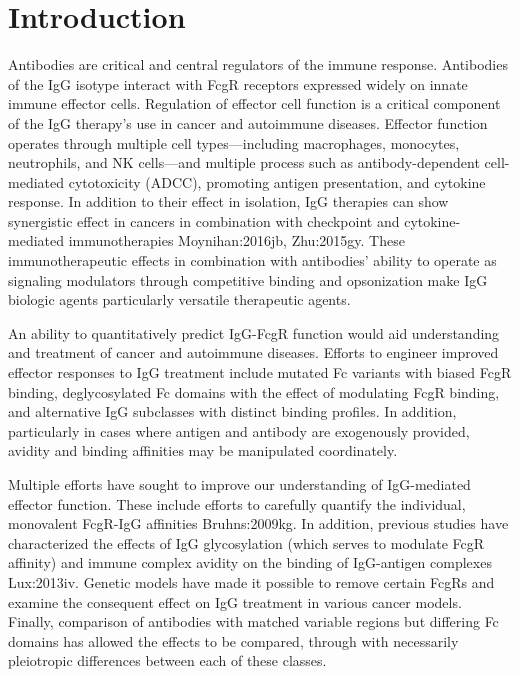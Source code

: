 \section{Introduction}

Antibodies are critical and central regulators of the immune response. Antibodies of the IgG isotype interact with FcgR receptors expressed widely on innate immune effector cells. Regulation of effector cell function is a critical component of the IgG therapy's use in cancer and autoimmune diseases. Effector function operates through multiple cell types---including macrophages, monocytes, neutrophils, and NK cells---and multiple process such as antibody-dependent cell-mediated cytotoxicity (ADCC), promoting antigen presentation, and cytokine response. In addition to their effect in isolation, IgG therapies can show synergistic effect in cancers in combination with checkpoint and cytokine-mediated immunotherapies \ac{Moynihan:2016jb, Zhu:2015gy}. These immunotherapeutic effects in combination with antibodies' ability to operate as signaling modulators through competitive binding and opsonization make IgG biologic agents particularly versatile therapeutic agents.

An ability to quantitatively predict IgG-FcgR function would aid understanding and treatment of cancer and autoimmune diseases. Efforts to engineer improved effector responses to IgG treatment include mutated Fc variants with biased FcgR binding, deglycosylated Fc domains with the effect of modulating FcgR binding, and alternative IgG subclasses with distinct binding profiles. In addition, particularly in cases where antigen and antibody are exogenously provided, avidity and binding affinities may be manipulated coordinately. %

Multiple efforts have sought to improve our understanding of IgG-mediated effector function. These include efforts to carefully quantify the individual, monovalent FcgR-IgG affinities \ac{Bruhns:2009kg}. In addition, previous studies have characterized the effects of IgG glycosylation (which serves to modulate FcgR affinity) and immune complex avidity on the binding of IgG-antigen complexes \ac{Lux:2013iv}. Genetic models have made it possible to remove certain FcgRs and examine the consequent effect on IgG treatment in various cancer models. Finally, comparison of antibodies with matched variable regions but differing Fc domains has allowed the effects to be compared, through with necessarily pleiotropic differences between each of these classes.

